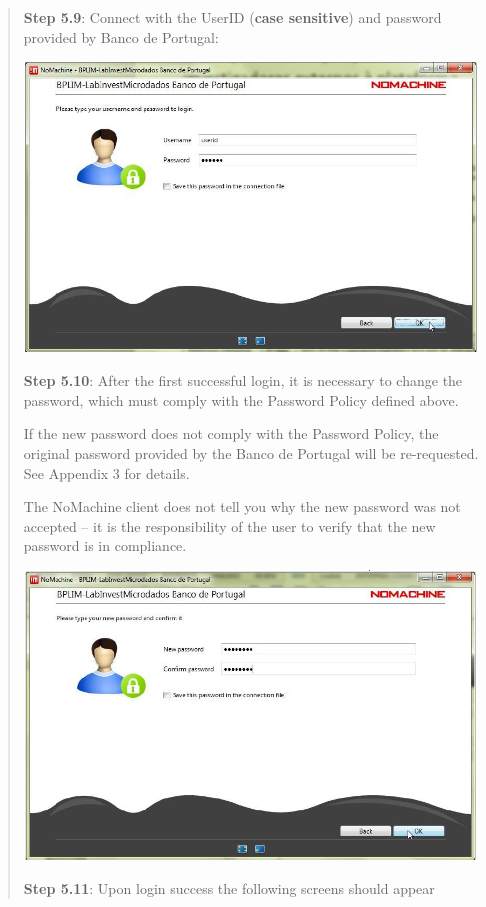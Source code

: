 \documentclass[]{book}
\begin{document}
\begin{quote}
\textbf{Step 5.9}: Connect with the UserID (\textbf{case sensitive}) and
password provided by Banco de Portugal:

\includegraphics[width=4.72441in,height=3.03504in]{./media/image34.png}

\textbf{Step 5.10}: After the first successful login, it is necessary to
change the password, which must comply with the Password Policy
defined above.

If the new password does not comply with the Password Policy, the
original password provided by the Banco de Portugal will be
re-requested. See Appendix 3 for details.

The NoMachine client does not tell you why the new password was not
accepted -- it is the responsibility of the user to verify that the
new password is in compliance.

\includegraphics[width=4.72441in,height=3.02972in]{./media/image35.png}

\textbf{Step 5.11}: Upon login success the following screens should appear


\end{quote}
\end{document}
